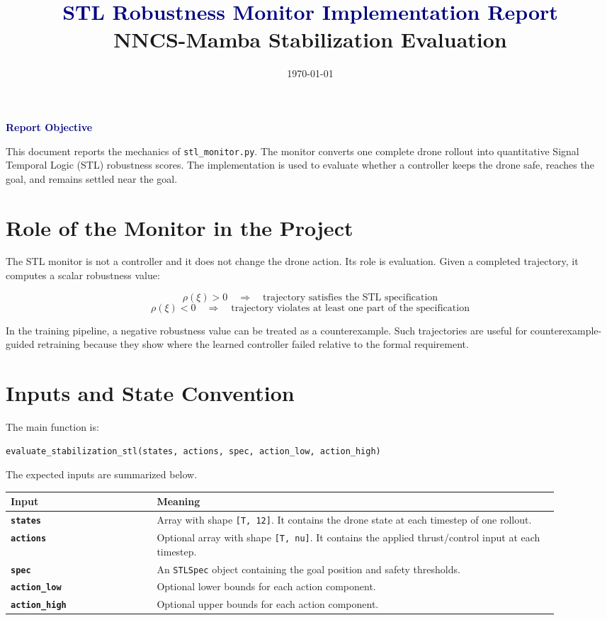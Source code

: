 \documentclass[11pt]{article}
\title{
  \vspace{-1.2cm}
  \textbf{\textcolor{navy}{STL Robustness Monitor Implementation Report}}\\
  \large NNCS-Mamba Stabilization Evaluation
}
\author{}
\date{\today}
\newcommand{\code}[1]{\texttt{#1}}
\newcommand{\rob}{\rho}
\newcommand{\traj}{\xi}
\newcommand{\reportbox}[2]{
  \vspace{4pt}
  \noindent\colorbox{softgray}{
    \parbox{\dimexpr0.98\linewidth-2\fboxsep\relax}{
      \textbf{\textcolor{navy}{#1}}\par
      #2
    }
  }
  \vspace{4pt}
}
\begin{document}
\maketitle
\thispagestyle{fancy}

\reportbox{Report Objective}{
This document reports the mechanics of \code{stl\_monitor.py}. The monitor converts one complete drone rollout into quantitative Signal Temporal Logic (STL) robustness scores. The implementation is used to evaluate whether a controller keeps the drone safe, reaches the goal, and remains settled near the goal.
}

\section{Role of the Monitor in the Project}

The STL monitor is not a controller and it does not change the drone action. Its role is evaluation. Given a completed trajectory, it computes a scalar robustness value:

\[
\rob(\traj) > 0 \quad \Rightarrow \quad \text{trajectory satisfies the STL specification}
\]
\[
\rob(\traj) < 0 \quad \Rightarrow \quad \text{trajectory violates at least one part of the specification}
\]

In the training pipeline, a negative robustness value can be treated as a counterexample. Such trajectories are useful for counterexample-guided retraining because they show where the learned controller failed relative to the formal requirement.

\section{Inputs and State Convention}

The main function is:

\begin{lstlisting}[language=Python]
evaluate_stabilization_stl(states, actions, spec, action_low, action_high)
\end{lstlisting}

The expected inputs are summarized below.

\begin{center}
\begin{tabular}{>{\bfseries}p{0.24\linewidth}p{0.66\linewidth}}
\toprule
Input & Meaning \\
\midrule
\code{states} & Array with shape \code{[T, 12]}. It contains the drone state at each timestep of one rollout. \\
\code{actions} & Optional array with shape \code{[T, nu]}. It contains the applied thrust/control input at each timestep. \\
\code{spec} & An \code{STLSpec} object containing the goal position and safety thresholds. \\
\code{action\_low} & Optional lower bounds for each action component. \\
\code{action\_high} & Optional upper bounds for each action component. \\
\bottomrule
\end{tabular}
\end{center}
\end{document}
